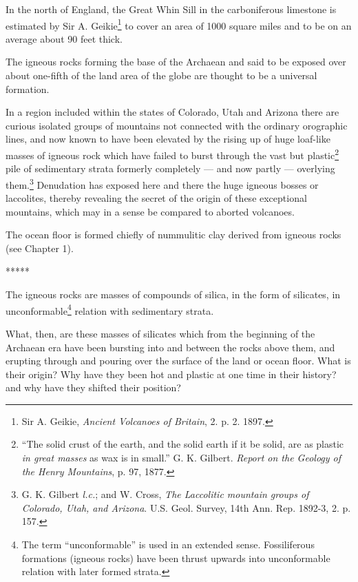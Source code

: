 \documentclass[a4paper, 12pt, oneside]{article}
\begin{document}
In the north of England, the Great Whin Sill in the carboniferous limestone is estimated by Sir A. Geikie\footnote{Sir A. Geikie, \emph{Ancient Volcanoes of Britain}, 2. p. 2. 1897.} to cover an area of 1000 square miles and to be on an average about 90 feet thick.

The igneous rocks forming the base of the Archaean and said to be exposed over about one-fifth of the land area of the globe are thought to be a universal formation.

In a region included within the states of Colorado, Utah and Arizona there are curious isolated groups of mountains not connected with the ordinary orographic lines, and now known to have been elevated by the rising up of huge loaf-like masses of igneous rock which have failed to burst through the vast but plastic\footnote{``The solid crust of the earth, and the solid earth if it be solid, are as plastic \emph{in great masses} as wax is in small.'' G. K. Gilbert. \emph{Report on the Geology of the Henry Mountains}, p. 97, 1877.} pile of sedimentary strata formerly completely --- and now partly --- overlying them.\footnote{G. K. Gilbert \emph{l.c.}; and W. Cross, \emph{The Laccolitic mountain groups of Colorado, Utah, and Arizona}. U.S. Geol. Survey, 14th Ann. Rep. 1892-3, 2. p. 157.} Denudation has exposed here and there the huge igneous bosses or laccolites, thereby revealing the secret of the origin of these exceptional mountains, which may in a sense be compared to aborted volcanoes.

The ocean floor is formed chiefly of nummulitic clay derived from igneous rocks (see Chapter 1).

\centerline{*\hspace{15mm}*\hspace{15mm}*\hspace{15mm}*\hspace{15mm}*}
\bigskip

The igneous rocks are masses of compounds of silica, in the form of silicates, in unconformable\footnote{The term ``unconformable'' is used in an extended sense. Fossiliferous formations (igneous rocks) have been thrust upwards into unconformable relation with later formed strata.} relation with sedimentary strata.

What, then, are these masses of silicates which from the beginning of the Archaean era have been bursting into and between the rocks above them, and erupting through and pouring over the surface of the land or ocean floor. What is their origin? Why have they been hot and plastic at one time in their history? and why have they shifted their position?
\end{document}
